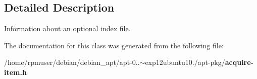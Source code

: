 \subsection{\-Detailed \-Description}
\-Information about an optional index file. 

\-The documentation for this class was generated from the following file\-:\begin{DoxyCompactItemize}
\item 
/home/rpmuser/debian/debian\-\_\-apt/apt-\/0..$\sim$exp12ubuntu10./apt-\/pkg/{\bf acquire-\/item.\-h}\end{DoxyCompactItemize}

